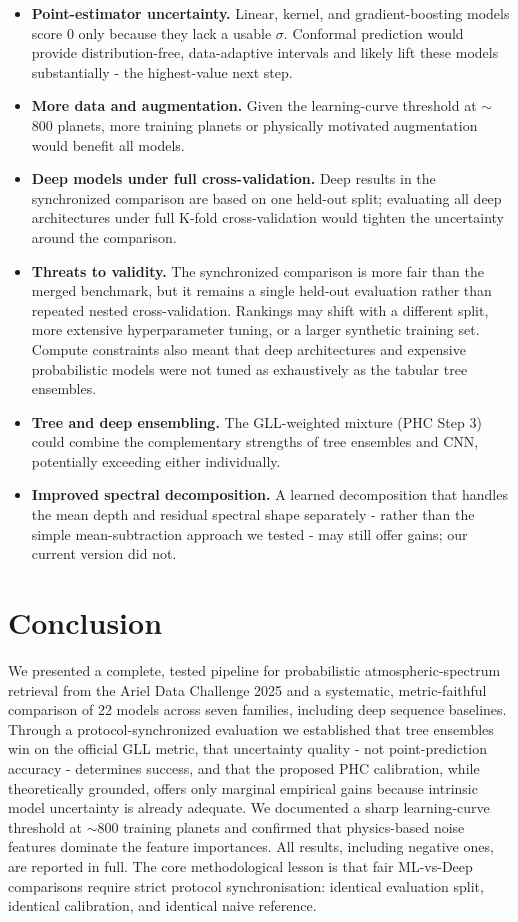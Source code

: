 \documentclass[12pt]{article}
\begin{document}
\begin{itemize}
\item \textbf{Point-estimator uncertainty.} Linear, kernel, and gradient-boosting models score 0 only because they lack a usable $\sigma$. Conformal prediction \cite{angelopoulos2023} would provide distribution-free, data-adaptive intervals and likely lift these models substantially - the highest-value next step.
\item \textbf{More data and augmentation.} Given the learning-curve threshold at $\sim$800 planets, more training planets or physically motivated augmentation would benefit all models.
\item \textbf{Deep models under full cross-validation.} Deep results in the synchronized comparison are based on one held-out split; evaluating all deep architectures under full K-fold cross-validation would tighten the uncertainty around the comparison.
\item \textbf{Threats to validity.} The synchronized comparison is more fair than the merged benchmark, but it remains a single held-out evaluation rather than repeated nested cross-validation. Rankings may shift with a different split, more extensive hyperparameter tuning, or a larger synthetic training set. Compute constraints also meant that deep architectures and expensive probabilistic models were not tuned as exhaustively as the tabular tree ensembles.
\item \textbf{Tree and deep ensembling.} The GLL-weighted mixture (PHC Step 3) could combine the complementary strengths of tree ensembles and CNN, potentially exceeding either individually.
\item \textbf{Improved spectral decomposition.} A learned decomposition that handles the mean depth and residual spectral shape separately - rather than the simple mean-subtraction approach we tested - may still offer gains; our current version did not.
\end{itemize}


\section{Conclusion}

We presented a complete, tested pipeline for probabilistic atmospheric-spectrum retrieval from the Ariel Data Challenge 2025 \cite{mugnai2025} and a systematic, metric-faithful comparison of 22 models across seven families, including deep sequence baselines. Through a protocol-synchronized evaluation we established that tree ensembles win on the official GLL metric, that uncertainty quality - not point-prediction accuracy - determines success, and that the proposed PHC calibration, while theoretically grounded, offers only marginal empirical gains because intrinsic model uncertainty is already adequate. We documented a sharp learning-curve threshold at $\sim$800 training planets and confirmed that physics-based noise features dominate the feature importances. All results, including negative ones, are reported in full. The core methodological lesson is that fair ML-vs-Deep comparisons require strict protocol synchronisation: identical evaluation split, identical calibration, and identical naive reference.
\end{document}
